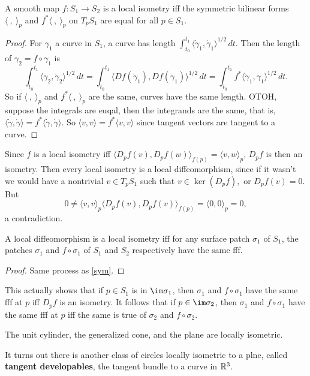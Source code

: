 \begin{theorem}\label{sym} 
    A smooth map $f \colon S_1 \to S_2$ is a local isometry iff the symmetric bilinear forms $\langle \ , \ \rangle _p $ and $f^*\langle \ ,\ \rangle _p$ on $T_p S_1$ are equal for all $p \in S_1$.
\end{theorem}
\begin{proof}
    For $\gamma _1$ a curve in $S_1$, a curve has length $\int_{t_0}^{t_1} \langle \dot \gamma_1,\dot \gamma_1   \rangle ^{1 /2} \, dt$. Then the length of $\gamma_2=f \circ \gamma_1 $ is \[
        \int_{t_0}^{t_1} \langle \dot \gamma_2,\dot \gamma_2   \rangle ^{1 /2} \, dt=\int_{t_0}^{t_1} \langle Df(\dot \gamma_1),Df(\dot \gamma_1)   \rangle ^{1 /2} \, dt=\int_{t_0}^{t_1} f^*\langle \dot \gamma_1,\dot \gamma_1   \rangle ^{1 /2} \, dt.
    \] So if $\langle \ ,\ \rangle _p$ and $f^*\langle \ ,\ \rangle _p$ are the same, curves have the same length. OTOH, suppose the integrals are euqal, then the integrands are the same, that is, $\langle \dot \gamma ,\dot \gamma  \rangle =f^*\langle \dot \gamma ,\dot \gamma  \rangle $. So $\langle v,v \rangle =f^*\langle v,v \rangle $ since tangent vectors are tangent to a curve. 
\end{proof}
Since $f$ is a local isometry iff $\langle D_p f(v) , D_pf(w)\rangle _{f(p)}=\langle v,w \rangle _p$, $D_p f$ is then an isometry. Then every local isometry is a local diffeomorphism, since if it wasn't we would have a nontrivial $v \in T_p S_1$ such that $v \in \ker (D_p f),$ or $D_pf(v)=0$. But  \[
    0\neq \langle v,v \rangle _p \langle D_p f(v),D_pf(v) \rangle _{f(p)}=\langle 0,0 \rangle _p=0,
\] a contradiction.
\begin{cor}
    A local diffeomorphism is a local isometry iff for any surface patch $\sigma_1$ of $S_1$, the patches $\sigma_1$ and $f \circ \sigma_1$ of $S_1$ and $S_2$ respectively have the same fff.
\end{cor}
\begin{proof}
    Same process as \cref{sym}.
\end{proof}
This actually shows that if $p \in  S_1$ is in $\im \sigma_1$, then $\sigma_1$ and $f \circ \sigma_1$ have the same fff at $p$ iff $D_p f$ is an isometry. It follows that if $p \in \im \sigma_2$, then $\sigma_1$ and $f \circ \sigma_1$ have the same fff at $p$ iff the same is true of $\sigma_2$ and $f \circ \sigma_2$.
\begin{example}
    The unit cylinder, the generalized cone, and the plane are locally isometric.
\end{example}
It turns out there is another class of circles locally isometric to a plne, called \textbf{tangent developables}, the tangent bundle to a curve in $\mathbb{R}^3$.

